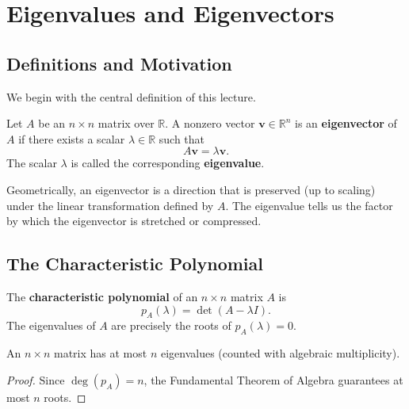 \documentclass[
    language=english,
    doctype=lecture-notes,
    institution=none,
]{../../omnilatex}
\begin{document}
\maketitle

\section{Eigenvalues and Eigenvectors}

\subsection{Definitions and Motivation}

We begin with the central definition of this lecture.

\begin{definition}
Let $A$ be an $n \times n$ matrix over $\mathbb{R}$.  A nonzero vector
$\mathbf{v} \in \mathbb{R}^n$ is an \textbf{eigenvector} of $A$ if there
exists a scalar $\lambda \in \mathbb{R}$ such that
\[
    A\mathbf{v} = \lambda \mathbf{v}.
\]
The scalar $\lambda$ is called the corresponding \textbf{eigenvalue}.
\end{definition}

\begin{remark}
Geometrically, an eigenvector is a direction that is preserved (up to scaling)
under the linear transformation defined by $A$.  The eigenvalue tells us the
factor by which the eigenvector is stretched or compressed.
\end{remark}

\subsection{The Characteristic Polynomial}

\begin{definition}
The \textbf{characteristic polynomial} of an $n \times n$ matrix $A$ is
\[
    p_A(\lambda) = \det(A - \lambda I).
\]
The eigenvalues of $A$ are precisely the roots of $p_A(\lambda) = 0$.
\end{definition}

\begin{theorem}
An $n \times n$ matrix has at most $n$ eigenvalues (counted with algebraic
multiplicity).
\end{theorem}

\begin{proof}
Since $\deg(p_A) = n$, the Fundamental Theorem of Algebra guarantees at most
$n$ roots.
\end{proof}
\end{document}
